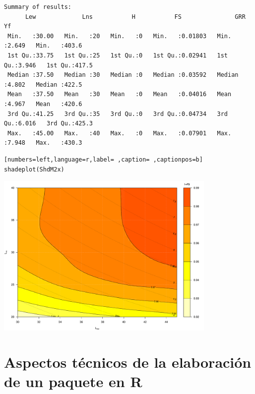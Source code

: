 \begin{verbatim}
Summary of results:
      Lew             Lns           H           FS               GRR              Yf       
 Min.   :30.00   Min.   :20   Min.   :0   Min.   :0.01803   Min.   :2.649   Min.   :403.6  
 1st Qu.:33.75   1st Qu.:25   1st Qu.:0   1st Qu.:0.02941   1st Qu.:3.946   1st Qu.:417.5  
 Median :37.50   Median :30   Median :0   Median :0.03592   Median :4.802   Median :422.5  
 Mean   :37.50   Mean   :30   Mean   :0   Mean   :0.04016   Mean   :4.967   Mean   :420.6  
 3rd Qu.:41.25   3rd Qu.:35   3rd Qu.:0   3rd Qu.:0.04734   3rd Qu.:6.016   3rd Qu.:425.3  
 Max.   :45.00   Max.   :40   Max.   :0   Max.   :0.07901   Max.   :7.948   Max.   :430.3
\end{verbatim}

\begin{lstlisting}[numbers=left,language=r,label= ,caption= ,captionpos=b]
shadeplot(ShdM2x)
\end{lstlisting}

\begin{center}
\includegraphics[width=0.8\textwidth]{figuras/codigo-optimshd.pdf}
\end{center}


\section{Aspectos técnicos de la elaboración de un paquete en R}
\label{sec:org9930f76}
\label{sec:aspectos-tecnicos}

